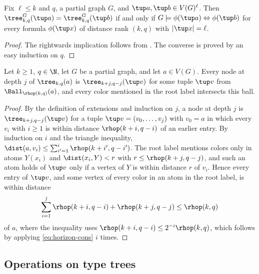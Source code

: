 \begin{corollary}\label{cor:tp-tree}
   Fix $\ell\le k$ and $q$,  a partial graph $G$, and  $\tup a,\tup b\in V(G)^\ell$. Then $\tree^G_{k,q}(\tup a)=\tree^G_{k,q}(\tup b)$ if and only if $G\models \phi(\tup a)\Leftrightarrow \phi(\tup b)$ for every \distFO formula $\phi(\tup x)$  of distance rank $(k,q)$ with $|\tup x|=\ell$.
\end{corollary}
\begin{proof}
   The rightwards implication follows from . The converse is proved by an easy induction on $q$.
\end{proof}

\begin{lemma}[locality]\label{lem:locality}
Let $k\ge1$, $q\in\N$, let $G$ be a partial graph, and let $a\in V(G)$.
Every node at depth $j$ of $\tree_{k,q}(a)$ is $\tree_{k+j,q-j}(\tup v)$ for some tuple $\tup v$ from $\Ball_{\rhop(k,q)}(a)$, and every color mentioned in the root label intersects this ball.
\end{lemma}
\begin{proof}
By the definition of extensions and induction on $j$, a node at depth $j$ is $\tree_{k+j,q-j}(\tup v)$ for a tuple $\tup v=(v_0,\ldots,v_j)$ with $v_0=a$ in which every $v_i$ with $i\ge1$ is within distance $\rhop(k+i,q-i)$ of an earlier entry.
By induction on $i$ and the triangle inequality, $\dist(a,v_i)\le\sum_{i'=1}^{i}\rhop(k+i',q-i')$.
The root label mentions colors only in atoms $Y(x_i)$ and $\dist(x_i,Y)<r$ with $r\le\rhop(k+j,q-j)$, and such an atom holds of $\tup v$ only if a vertex of $Y$ is within distance $r$ of $v_i$.
Hence every entry of $\tup v$, and some vertex of every color in an atom in the root label, is within distance
\[
\sum_{i=1}^{j}\rhop(k+i,q-i)+\rhop(k+j,q-j)\le\rhop(k,q)
\]
of $a$, where the inequality uses $\rhop(k+i,q-i)\le2^{-i}\rhop(k,q)$, which follows by applying \eqref{eq:horizon-cons} $i$ times.
\end{proof}

\subsection{Operations on type trees}


